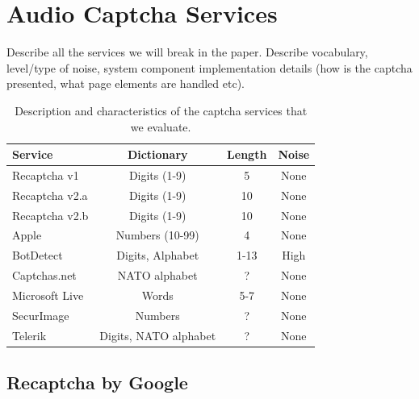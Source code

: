\section{Audio Captcha Services}
\label{sec:services}

Describe all the services we will break in the paper. Describe vocabulary, level/type of noise,
system component implementation details (how is the captcha presented, what page elements are handled etc).

\begin{table}[H]
\centering
\caption{Description and characteristics of the captcha services that we evaluate.}
\begin{tabular}{lccc}
\toprule
\textbf{Service}& \textbf{Dictionary}& \textbf{Length} & \textbf{Noise} \\
\hline
Recaptcha v1 & Digits (1-9) & 5 & None \\
\rowcolor{Gray}
Recaptcha v2.a & Digits (1-9) & 10 & None \\
Recaptcha v2.b & Digits (1-9) & 10 & None \\
\rowcolor{Gray}
Apple & Numbers (10-99) & 4 & None \\
BotDetect & Digits, Alphabet & 1-13 & High \\
\rowcolor{Gray}
Captchas.net & NATO alphabet & ? & None \\
Microsoft Live & Words & 5-7 & None \\
\rowcolor{Gray}
SecurImage & Numbers & ? & None \\
Telerik & Digits, NATO alphabet & ?  & None \\
\bottomrule
\end{tabular}
\label{tab:services}
\end{table}

\subsection{Recaptcha by Google}

